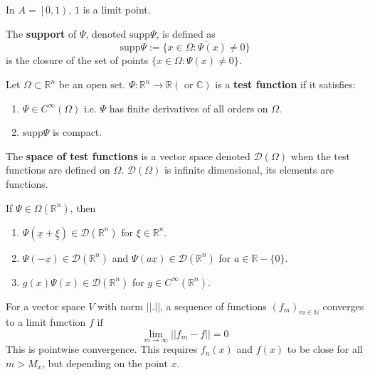 \begin{example}
	In $A = \left[0, 1 \right)$, $1$ is a limit point.
\end{example}

\begin{definition}
	The \textbf{support} of $\Psi$, denoted $\text{supp} \Psi$, is defined as
	\[
		\text{supp} \Psi := \overline{\{ x \in \Omega: \Psi(x) \ne 0 \}}
	\]
	is the closure of the set of points $\{ x \in \Omega: \Psi(x) \ne 0 \}$.
\end{definition}

\begin{definition}
	Let $\Omega \subset \mathbb{R}^n$ be an open set. $\Psi: \mathbb{R}^n \rightarrow \mathbb{R} (\text{ or } \mathbb{C})$ is a \textbf{test function} if it satisfies:
	\begin{enumerate}
		\item $\Psi \in C^{\infty} (\Omega)$ i.e. $\Psi$ has finite derivatives of all orders on $\Omega$.
		\item $\text{supp} \Psi$ is compact.
	\end{enumerate}
\end{definition}

\begin{definition}
	The \textbf{space of test functions} is a vector space denoted $\mathcal{D}(\Omega)$ when the test functions are defined on $\Omega$. $\mathcal{D}(\Omega)$ is infinite dimensional, its elements are functions.
\end{definition}

\begin{proposition}
	If $\Psi \in \Omega(\mathbb{R}^n)$, then
	\begin{enumerate}
		\item $\Psi(\underline{x} + \underline{\xi}) \in \mathcal{D} (\mathbb{R}^n)$ for $\xi \in \mathbb{R}^n$.
		\item $\Psi(-\underline{x}) \in \mathcal{D}(\mathbb{R}^n)$ and $\Psi(a \underline{x}) \in \mathcal{D}(\mathbb{R}^n)$ for $a \in \mathbb{R} - \{ 0 \}$.
		\item $g(x) \Psi(x) \in \mathcal{D}(\mathbb{R}^n)$ for $g \in C^{\infty} (\mathbb{R}^n)$.
	\end{enumerate}
\end{proposition}

\begin{remark}
	For a vector space $V$ with norm $|| . ||$, a sequence of functions ${(f_m)}_{m \in \mathbb{N}}$ converges to a limit function $f$ if
	\[
		\lim_{m \rightarrow \infty} || f_m - f || = 0
	\]
	This is pointwise convergence. This requires $f_n(x)$ and $f(x)$ to be close for all $m > M_x$, but depending on the point $x$.
\end{remark}

